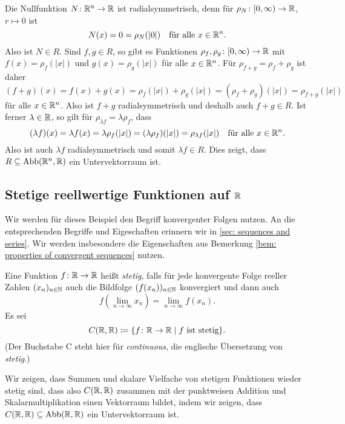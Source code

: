 Die Nullfunktion $N \colon \mathbb{R}^n \to \mathbb{R}$ ist radialsymmetrisch, denn für $\rho_N \colon [0,\infty) \to \mathbb{R}$, $r \mapsto 0$ ist
\[
 N(x) = 0 = \rho_N(|0|)
 \quad
 \text{für alle $x \in \mathbb{R}^n$}.
\]
Also ist $N \in R$. Sind $f,g \in R$, so gibt es Funktionen $\rho_f, \rho_g \colon [0,\infty) \to \mathbb{R}$ mit $f(x) = \rho_f(|x|)$ und $g(x) = \rho_g(|x|)$ für alle $x \in \mathbb{R}^n$. Für $\rho_{f+g} = \rho_f + \rho_g$ ist daher
\[
 (f+g)(x)
 = f(x) + g(x)
 = \rho_f(|x|) + \rho_g(|x|)
 = (\rho_f + \rho_g)(|x|)
 = \rho_{f+g}(|x|)
\]
für alle $x \in \mathbb{R}^n$. Also ist $f+g$ radialsymmetrisch und deshalb auch $f+g \in R$. Ist ferner $\lambda \in \mathbb{R}$, so gilt für $\rho_{\lambda f} = \lambda \rho_f$, dass
\[
 (\lambda f)(x)
 = \lambda f(x)
 = \lambda \rho_f(|x|)
 = (\lambda \rho_f)(|x|)
 = \rho_{\lambda f}(|x|)
 \quad
 \text{für alle $x \in \mathbb{R}^n$}.
\]
Also ist auch $\lambda f$ radialsymmetrisch und somit $\lambda f \in R$. Dies zeigt, dass \mbox{$R \subseteq \mathrm{Abb}(\mathbb{R}^n, \mathbb{R})$} ein Untervektorraum ist.



\subsection{Stetige reellwertige Funktionen auf \texorpdfstring{$\mathbb{R}$}{R}}
Wir werden für dieses Beispiel den Begriff konvergenter Folgen nutzen. An die entsprechenden Begriffe und Eigeschaften erinnern wir in \ref{sec: sequences and series}. Wir werden insbesondere die Eigenschaften aus Bemerkung \ref{bem: properties of convergent sequences} nutzen.

\begin{defi}
 Eine Funktion $f \colon \mathbb{R} \to \mathbb{R}$ heißt \emph{stetig}, falls für jede konvergente Folge reeller Zahlen $(x_n)_{n \in \mathbb{N}}$ auch die Bildfolge $(f(x_n))_{n \in \mathbb{N}}$ konvergiert und dann auch
 \[
  f\left( \lim_{n \to \infty} x_n \right)
  = \lim_{n \to \infty} f(x_n).
 \]
 Es sei
 \[
  C(\mathbb{R},\mathbb{R}) \coloneqq \{f \colon \mathbb{R} \to \mathbb{R} \mid \text{$f$ ist stetig}\}.
 \]
 (Der Buchstabe C steht hier für \emph{continuous}, die englische Übersetzung von \emph{stetig}.)
\end{defi}

Wir zeigen, dass Summen und skalare Vielfache von stetigen Funktionen wieder stetig sind, dass also $C(\mathbb{R},\mathbb{R})$ zusammen mit der punktweisen Addition und Skalarmultiplikation einen Vektorraum bildet, indem wir zeigen, dass $C(\mathbb{R}, \mathbb{R}) \subseteq \mathrm{Abb}(\mathbb{R}, \mathbb{R})$ ein Untervektorraum ist.

